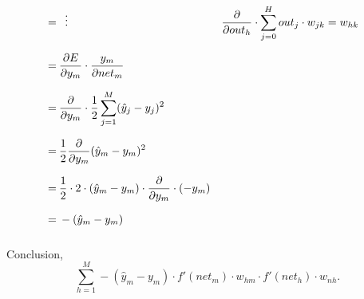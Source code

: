 \documentclass[12pt]{article}
\begin{document}
\begin{equation}
\begin{aligned}
                                          \:=\: & \mathrel{\makebox[\widthof{=}]{\vdots}}                                                              & \frac{\partial}{\partial out_{h}} \cdot \sum_{j=0}^{H} out_{j} \cdot w_{jk} = w_{hk}                                                                              \\[0.68em]
                                          \:=\: & \frac{\partial E}{\partial y_{m}} \cdot \frac{y_{m} }{\partial net_{m} }                             &                                                              &                                                                  \\[0.68em]
                                          \:=\: & \frac{\partial}{\partial y_{m}} \cdot \frac{1}{2} \sum_{j=1}^{M} (\hat{y}_{j} - y_{j})^{2}             &                                                              &                                                                  \\[0.68em]
                                          \:=\: & \frac{1}{2} \frac{\partial}{\partial y_{m}} (\hat{y}_{m} - y_{m})^{2}             &                                                              &                                                                  \\[0.68em]
                                          \:=\: & \frac{1}{2} \cdot 2 \cdot (\hat{y}_{m} - y_{m}) \cdot  \frac{\partial}{\partial y_{m}} \cdot (-y_{m} )            &                                                              &                                                                  \\[0.68em]
                                          \:=\: & -(\hat{y}_{m} - y_{m})            &                                                              &                                                                  \\[0.68em]
    \end{aligned}
\end{equation}

Conclusion, $$ \sum_{h=1}^{M} - (\hat{y}_{m} - y_{m}) \cdot f'(net_{m}) \cdot w_{hm} \cdot f'(net_{h}) \cdot w_{nh}. $$
\end{document}
